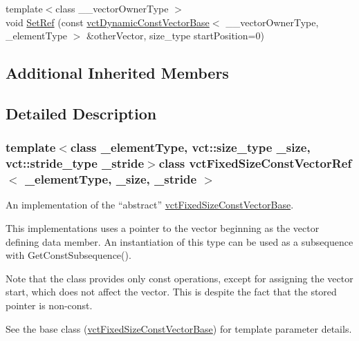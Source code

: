 \begin{DoxyCompactItemize}
\item 
{\footnotesize template$<$class \-\_\-\-\_\-vector\-Owner\-Type $>$ }\\void \hyperlink{classvct_fixed_size_const_vector_ref_aa1350bde6a5da6b105ad199b730f4d24}{Set\-Ref} (const \hyperlink{classvct_dynamic_const_vector_base}{vct\-Dynamic\-Const\-Vector\-Base}$<$ \-\_\-\-\_\-vector\-Owner\-Type, \-\_\-element\-Type $>$ \&other\-Vector, size\-\_\-type start\-Position=0)
\end{DoxyCompactItemize}
\subsection*{Additional Inherited Members}


\subsection{Detailed Description}
\subsubsection*{template$<$class \-\_\-element\-Type, vct\-::size\-\_\-type \-\_\-size, vct\-::stride\-\_\-type \-\_\-stride$>$class vct\-Fixed\-Size\-Const\-Vector\-Ref$<$ \-\_\-element\-Type, \-\_\-size, \-\_\-stride $>$}

An implementation of the ``abstract'' \hyperlink{classvct_fixed_size_const_vector_base}{vct\-Fixed\-Size\-Const\-Vector\-Base}. 

This implementations uses a pointer to the vector beginning as the vector defining data member. An instantiation of this type can be used as a subsequence with Get\-Const\-Subsequence().

Note that the class provides only const operations, except for assigning the vector start, which does not affect the vector. This is despite the fact that the stored pointer is non-\/const.

See the base class (\hyperlink{classvct_fixed_size_const_vector_base}{vct\-Fixed\-Size\-Const\-Vector\-Base}) for template parameter details. 

